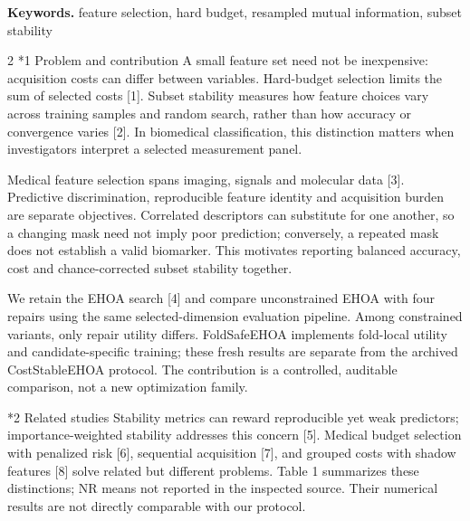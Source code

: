 \documentclass[10pt,a4paper]{article}
\makeatletter
\renewcommand{\section}{\@startsection{section}{1}{0pt}{5pt}{2pt}{\normalfont\normalsize\bfseries}}
\newcommand{\sect}[1]{\section*{#1}}
\makeatother
\begin{document}
\textbf{Keywords. } feature selection, hard budget, resampled mutual information, subset stability
\begin{multicols}{2}\raggedcolumns
\sect{1  Problem and contribution}
A small feature set need not be inexpensive: acquisition costs can differ between variables. Hard-budget selection limits the sum of selected costs [1]. Subset stability measures how feature choices vary across training samples and random search, rather than how accuracy or convergence varies [2]. In biomedical classification, this distinction matters when investigators interpret a selected measurement panel.

Medical feature selection spans imaging, signals and molecular data [3]. Predictive discrimination, reproducible feature identity and acquisition burden are separate objectives. Correlated descriptors can substitute for one another, so a changing mask need not imply poor prediction; conversely, a repeated mask does not establish a valid biomarker. This motivates reporting balanced accuracy, cost and chance-corrected subset stability together.

We retain the EHOA search [4] and compare unconstrained EHOA with four repairs using the same selected-dimension evaluation pipeline. Among constrained variants, only repair utility differs. FoldSafeEHOA implements fold-local utility and candidate-specific training; these fresh results are separate from the archived CostStableEHOA protocol. The contribution is a controlled, auditable comparison, not a new optimization family.

\sect{2  Related studies}
Stability metrics can reward reproducible yet weak predictors; importance-weighted stability addresses this concern [5]. Medical budget selection with penalized risk [6], sequential acquisition [7], and grouped costs with shadow features [8] solve related but different problems. Table 1 summarizes these distinctions; NR means not reported in the inspected source. Their numerical results are not directly comparable with our protocol.


\end{multicols}
\end{document}
